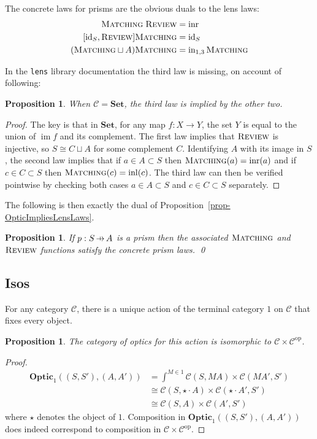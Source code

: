 \documentclass[11pt,a4paper]{article}
\theoremstyle{plain}
\newtheorem{proposition}[theorem]{Proposition}
\theoremstyle{definition}
\newcommand{\C}{\mathscr{C}}
\newcommand{\lenslib}{\texttt{lens}}
\newcommand{\Set}{\mathbf{Set}}
\newcommand{\Optic}{\mathbf{Optic}}
\newcommand{\id}{\mathrm{id}}
\newcommand{\op}{\mathrm{op}}
\newcommand{\inl}{\mathrm{inl}}
\newcommand{\inr}{\mathrm{inr}}
\DeclareMathOperator{\im}{im}
\newcommand{\freview}{\textsc{Review}}
\newcommand{\fmatching}{\textsc{Matching}}
\newcommand{\hto}{\ensuremath{\,\mathaccent\shortmid\rightarrow\,}}
\begin{document}
The concrete laws for prisms are the obvious duals to the lens laws:
\begin{align*}
  \fmatching \; \freview &= \inr \\
  [\id_S, \freview] \fmatching &= \id_S \\
  (\fmatching \sqcup A) \fmatching &= \mathrm{in}_{1,3} \, \fmatching
\end{align*}

In the \lenslib{} library documentation the third law is missing, on account of following:

\begin{proposition}
  When $\C = \Set$, the third law is implied by the other two.
\end{proposition}
\begin{proof}
  The key is that in $\Set$, for any map $f : X \to Y$, the set $Y$ is equal to the union of $\im f$ and its complement. The first law implies that $\freview$ is injective, so $S \cong C \sqcup A$ for some complement $C$. Identifying $A$ with its image in $S$, the second law implies that if $a\in A \subset S$ then $\fmatching(a) = \inr(a)$ and if $c\in C \subset S$ then $\fmatching(c) = \inl(c)$. The third law can then be verified pointwise by checking both cases $a\in A \subset S$ and $c\in C \subset S$ separately.
\end{proof}

The following is then exactly the dual of Proposition~\ref{prop-OpticImpliesLensLaws}.
\begin{proposition}\label{prop-OpticImpliesPrismLaws}
  If $p : S \hto A$ is a prism then the associated $\fmatching$ and $\freview$ functions satisfy the concrete prism laws. \qed
\end{proposition}

\subsection{Isos}

For any category $\C$, there is a unique action of the terminal category $1$ on $\C$ that fixes every object.

\begin{proposition}
  The category of optics for this action is isomorphic to $\C \times \C^\op$.
\end{proposition}
\begin{proof}
  \begin{align*}
    \Optic_1((S, S'), (A, A')) &= \int^{M \in 1} \C(S, MA) \times \C(MA', S') \\
                               &\cong \C(S, \star \cdot A) \times \C(\star \cdot A', S') \\
                               &\cong \C(S, A) \times \C(A', S')
  \end{align*}
  where $\star$ denotes the object of $1$. Composition in $\Optic_1((S, S'), (A, A'))$ does indeed correspond to composition in $\C \times \C^\op$.
\end{proof}
\end{document}
